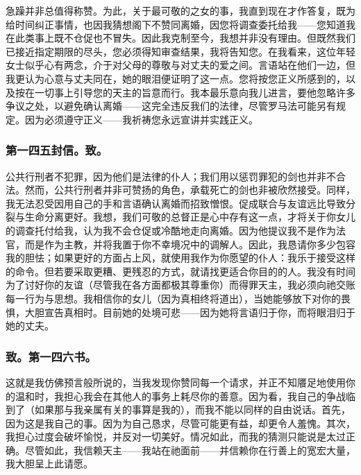 急躁并非总值得称赞。为此，关于最可敬的之女的事，我直到现在才作答复，既为给时间纠正事情，也因我猜想阁下不赞同离婚，因您将调查委托给我——您知道我在此类事上既不仓促也不冒失。因此我克制至今，我想并非没有理由。但既然我们已接近指定期限的尽头，您必须得知审查结果，我将告知您。在我看来，这位年轻女士似乎心有两念，介于对父母的尊敬与对丈夫的爱之间。言语站在他们一边，但我更认为心意与丈夫同在，她的眼泪便证明了这一点。您将按您正义所感到的，以及按在一切事上引导您的天主的旨意而行。我本最乐意向我儿进言，要他忽略许多争议之处，以避免确认离婚——这完全违反我们的法律，尽管罗马法可能另有规定。因为必须遵守正义——我祈祷您永远宣讲并实践正义。\par


\subsubsection{第一四五封信。致。}

公共行刑者不犯罪，因为他们是法律的仆人；我们用以惩罚罪犯的剑也并非不合法。然而，公共行刑者并非可赞扬的角色，承载死亡的剑也非被欣然接受。同样，我无法忍受因用自己的手和言语确认离婚而招致憎恨。促成联合与友谊远比导致分裂与生命分离更好。我想，我们可敬的总督正是心中存有这一点，才将关于你女儿的调查托付给我，认为我不会仓促或冷酷地走向离婚。因为他提议我不是作为法官，而是作为主教，并将我置于你不幸境况中的调解人。因此，我恳请你多少包容我的胆怯；如果更好的方面占上风，就使用我作为你愿望的仆人：我乐于接受这样的命令。但若要采取更糟、更残忍的方式，就请找更适合你目的的人。我没有时间为了讨好你的友谊（尽管我在各方面都极其尊重你）而得罪天主，我必须向祂交账每一行为与思想。我相信你的女儿（因为真相终将道出），当她能够放下对你的畏惧，大胆宣告真相时。目前她的处境可悲——因为她将言语归于你，而将眼泪归于她的丈夫。\par


\subsubsection{致。第一四六书。}

这就是我仿佛预言般所说的，当我发现你赞同每一个请求，并正不知餍足地使用你的温和时，我担心我会在其他人的事务上耗尽你的善意。因为看，我自己的争战临到了（如果那与我亲属有关的事算是我的），而我不能以同样的自由说话。首先，因为这是我自己的事。因为为自己恳求，尽管可能更有益，却更令人羞愧。其次，我担心过度会破坏愉悦，并反对一切美好。情况如此，而我的猜测只能说是太过正确。尽管如此，我信赖天主——我站在祂面前——并信赖你在行善上的宽宏大量，我大胆呈上此请愿。\par

